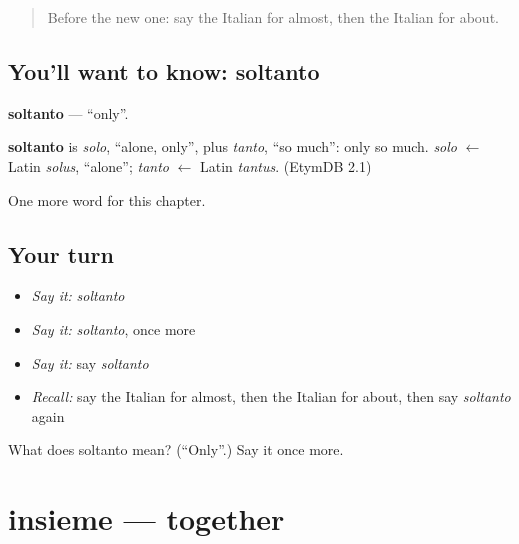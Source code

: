 \label{lesson:IT-C244-soltanto}



\begin{quote}
Before the new one: say the Italian for almost, then the Italian for about.
\end{quote}

\subsection*{You'll want to know: soltanto}
\textbf{soltanto} — \textquotedblleft{}only\textquotedblright{}.

\begin{cousinweb}
\textbf{soltanto} is \emph{solo}, \textquotedblleft{}alone, only\textquotedblright{}, plus \emph{tanto}, \textquotedblleft{}so much\textquotedblright{}: only so much. \emph{solo} $\leftarrow$ Latin \emph{solus}, \textquotedblleft{}alone\textquotedblright{}; \emph{tanto} $\leftarrow$ Latin \emph{tantus}. (EtymDB 2.1)
\end{cousinweb}

\begin{grammarlens}[title={What you've built}]
One more word for this chapter.
\end{grammarlens}

\subsection*{Your turn}
\begin{itemize}
\raggedright
  \item \emph{Say it:} \emph{soltanto}
  \item \emph{Say it:} \emph{soltanto}, once more
  \item \emph{Say it:} say \emph{soltanto}
  \item \emph{Recall:} say the Italian for almost, then the Italian for about, then say \emph{soltanto} again
\end{itemize}

\begin{tcolorbox}[breakable,colback=teal!4,colframe=teal!35!black,title={Before you move on}]
What does soltanto mean? (\textquotedblleft{}Only\textquotedblright{}.) Say it once more.
\end{tcolorbox}
\section[insieme]{insieme — together}


